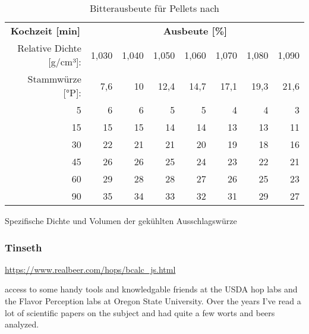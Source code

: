 \documentclass[a4paper,parskip=half]{scrartcl}
\begin{document}
\begin{table}[H]
\centering
\begin{tabular}{rrrrrrrr} 
\toprule
\multicolumn{1}{c}{\textbf{Kochzeit [min]}} & \multicolumn{7}{c}{\textbf{Ausbeute [\%]}}  \\
Relative Dichte [g/cm³]:                                        & 1,030 & 1,040 & 1,050 & 1,060 & 1,070 & 1,080  & 1,090                   \\
Stammwürze [°P]:                                            & 7,6 & 10 & 12,4 & 14,7 & 17,1 & 19,3  & 21,6                   \\  
\midrule
5                                            & 6     & 6     & 5     & 5     & 4     & 4      & 3                          \\
15                                           & 15    & 15    & 14    & 14    & 13    & 13     & 11                         \\
30                                           & 22    & 21    & 21    & 20    & 19    & 18     & 16                         \\
45                                           & 26    & 26    & 25    & 24    & 23    & 22     & 21                         \\
60                                           & 29    & 28    & 28    & 27    & 26    & 25     & 23                         \\
90                                           & 35    & 34    & 33    & 32    & 31    & 29     & 27                         \\
\bottomrule
\end{tabular}
\caption{Bitterausbeute für Pellets nach \citeauthor{Mosher1994} \parencite[51]{Holle2010}}
\label{table:mosherutilpellets}
\end{table}

\parencite[53]{Holle2010}
Spezifische Dichte und Volumen der gekühlten Ausschlagswürze

\subsubsection*{Tinseth}

\parencite{Tinseth1995}
\url{https://www.realbeer.com/hops/bcalc_js.html}

access to some handy tools and knowledgable friends at the USDA hop labs and the Flavor Perception labs at Oregon State University. Over the years I've read a lot of scientific papers on the subject and had quite a few worts and beers analyzed.
\end{document}
